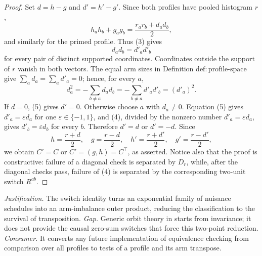 \documentclass{article}
\begin{document}
\begin{proof}
Set \(d=h-g\) and \(d'=h'-g'\).  Since both profiles have pooled histogram \(r\),
\[
 h_a h_b+g_a g_b=\frac{r_a r_b+d_a d_b}{2},
\]
and similarly for the primed profile.  Thus (3) gives
\[
 d_a d_b=d'_a d'_b                                      \tag{4}
\]
for every pair of distinct supported coordinates.  Coordinates outside the support of \(r\) vanish in both vectors.  The equal arm sizes in Definition \(\mathrm{def{:}profile\text{-}space}\) give \(\sum_a d_a=\sum_a d'_a=0\); hence, for every \(a\),
\[
 d_a^2=-\sum_{b\ne a}d_a d_b
      =-\sum_{b\ne a}d'_a d'_b=(d'_a)^2.               \tag{5}
\]
If \(d=0\), (5) gives \(d'=0\).  Otherwise choose \(a\) with \(d_a\ne0\).  Equation (5) gives \(d'_a=\varepsilon d_a\) for one \(\varepsilon\in\{-1,1\}\), and (4), divided by the nonzero number \(d'_a=\varepsilon d_a\), gives \(d'_b=\varepsilon d_b\) for every \(b\).  Therefore \(d'=d\) or \(d'=-d\).  Since
\[
 h=\frac{r+d}{2},\quad g=\frac{r-d}{2},\quad
 h'=\frac{r+d'}{2},\quad g'=\frac{r-d'}{2},
\]
we obtain \(C'=C\) or \(C'=(g,h)=C^\top\), as asserted.  Notice also that the proof is constructive: failure of a diagonal check is separated by \(D_r\), while, after the diagonal checks pass, failure of (4) is separated by the corresponding two-unit switch \(R^{ab}\).
\end{proof}
\par\smallskip\noindent \textit{Justification.} The switch identity turns an exponential family of nuisance schedules into an arm-imbalance outer product, reducing the classification to the survival of transposition. \textit{Gap.} Generic orbit theory in \cite{HemerikGoeman2018} starts from invariance; it does not provide the causal zero-sum switches that force this two-point reduction. \textit{Consumer.} It converts any future implementation of equivalence checking from comparison over all profiles to tests of a profile and its arm transpose.
\end{document}
